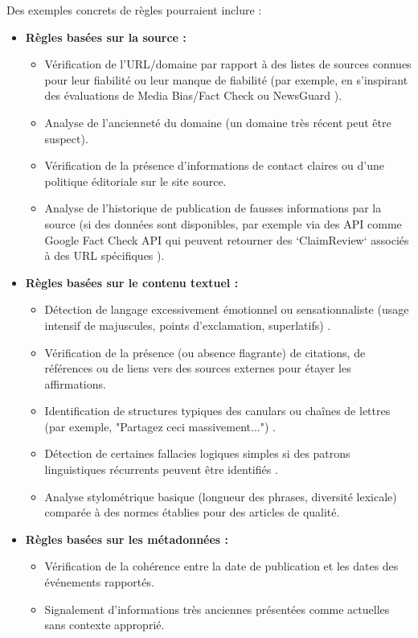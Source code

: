 \documentclass[9pt,twocolumn,french]{article}
\begin{document}
Des exemples concrets de règles pourraient inclure \citep{Pescuma2025, Rieh2014Credibility, Metzger2010, W3CCredibility2018, Kedzie2018, Oshikawa2019A} :
\begin{itemize}
    \item \textbf{Règles basées sur la source :}
        \begin{itemize}
            \item Vérification de l'URL/domaine par rapport à des listes de sources connues pour leur fiabilité ou leur manque de fiabilité (par exemple, en s'inspirant des évaluations de Media Bias/Fact Check ou NewsGuard \citep{Pescuma2025}).
            \item Analyse de l'ancienneté du domaine (un domaine très récent peut être suspect).
            \item Vérification de la présence d'informations de contact claires ou d'une politique éditoriale sur le site source.
            \item Analyse de l'historique de publication de fausses informations par la source (si des données sont disponibles, par exemple via des API comme Google Fact Check API qui peuvent retourner des `ClaimReview` associés à des URL spécifiques \citep{schema_claimreview, Google2026Fact}).
        \end{itemize}
    \item \textbf{Règles basées sur le contenu textuel :}
        \begin{itemize}
            \item Détection de langage excessivement émotionnel ou sensationnaliste (usage intensif de majuscules, points d'exclamation, superlatifs) \citep{Metzger2010}.
            \item Vérification de la présence (ou absence flagrante) de citations, de références ou de liens vers des sources externes pour étayer les affirmations.
            \item Identification de structures typiques des canulars ou chaînes de lettres (par exemple, "Partagez ceci massivement...") \citep{Metzger2010}.
            \item Détection de certaines fallacies logiques simples si des patrons linguistiques récurrents peuvent être identifiés \citep{Oshikawa2019A}.
            \item Analyse stylométrique basique (longueur des phrases, diversité lexicale) comparée à des normes établies pour des articles de qualité.
        \end{itemize}
    \item \textbf{Règles basées sur les métadonnées :}
        \begin{itemize}
            \item Vérification de la cohérence entre la date de publication et les dates des événements rapportés.
            \item Signalement d'informations très anciennes présentées comme actuelles sans contexte approprié.
        \end{itemize}
\end{itemize}
\end{document}
